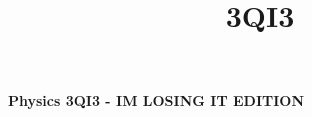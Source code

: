 \documentclass[letterpaper, 8pt]{extarticle}
\title{3QI3}
\begin{document}
\raggedright
\tiny


\begin{center}
    {\textbf{Physics 3QI3 - IM LOSING IT EDITION}} \\
\end{center}
\setlength{\premulticols}{1pt}
\setlength{\postmulticols}{1pt}
\setlength{\multicolsep}{1pt}
\setlength{\columnsep}{2pt}
\end{document}
